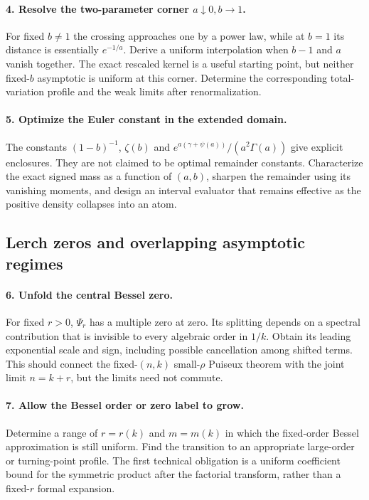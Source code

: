 \paragraph{4. Resolve the two-parameter corner $a\downarrow0,b\to1$.}
For fixed $b\ne1$ the crossing approaches one by a power law, while at
$b=1$ its distance is essentially $e^{-1/a}$. Derive a uniform
interpolation when $b-1$ and $a$ vanish together. The exact rescaled
kernel is a useful starting point, but neither fixed-$b$ asymptotic
is uniform at this corner. Determine the corresponding total-variation
profile and the weak limits after renormalization.

\paragraph{5. Optimize the Euler constant in the extended domain.}
The constants $(1-b)^{-1}$, $\zeta(b)$ and
$e^{a(\gamma+\psi(a))}/(a^2\Gamma(a))$ give explicit enclosures.
They are not claimed to be optimal remainder constants. Characterize
the exact signed mass as a function of $(a,b)$, sharpen the remainder
using its vanishing moments, and design an interval evaluator that
remains effective as the positive density collapses into an atom.

\subsection{Lerch zeros and overlapping asymptotic regimes}

\paragraph{6. Unfold the central Bessel zero.}
For fixed $r>0$, $\Psi_r$ has a multiple zero at zero. Its splitting
depends on a spectral contribution that is invisible to every algebraic
order in $1/k$. Obtain its leading exponential scale and sign, including
possible cancellation among shifted terms. This should connect the
fixed-$(n,k)$ small-$\rho$ Puiseux theorem with the joint limit
$n=k+r$, but the limits need not commute.

\paragraph{7. Allow the Bessel order or zero label to grow.}
Determine a range of $r=r(k)$ and $m=m(k)$ in which the fixed-order
Bessel approximation is still uniform. Find the transition to an
appropriate large-order or turning-point profile. The first technical
obligation is a uniform coefficient bound for the symmetric product
after the factorial transform, rather than a fixed-$r$ formal expansion.

